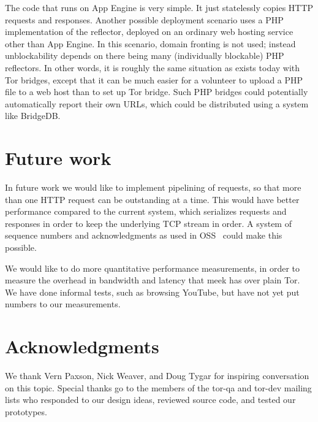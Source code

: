 \documentclass{article}
\begin{document}

The code that runs on App Engine is very simple.
It just statelessly copies HTTP requests and responses.
Another possible deployment scenario uses a PHP implementation of the reflector,
deployed on an ordinary web hosting service other than App Engine.
In this scenario, domain fronting is not used;
instead unblockability depends on there being many (individually blockable) PHP reflectors.
In other words, it is roughly the same situation as exists today with Tor bridges,
except that it can be much easier for a volunteer to upload a PHP file to a web host
than to set up Tor bridge.
Such PHP bridges could potentially automatically report their own URLs,
which could be distributed using a system like BridgeDB.

\section{Future work}

In future work we would like to implement pipelining of requests,
so that more than one HTTP request can be outstanding at a time.
This would have better performance compared to the current system,
which serializes requests and responses in order to keep the
underlying TCP stream in order.
A system of sequence numbers and acknowledgments as used in OSS~\cite{oss}
could make this possible.

We would like to do more quantitative performance measurements,
in order to measure the overhead in bandwidth and latency that meek has over plain Tor.
We have done informal tests, such as browsing YouTube,
but have not yet put numbers to our measurements.


\section{Acknowledgments}

We thank Vern Paxson, Nick Weaver, and Doug Tygar for inspiring conversation on this topic.
Special thanks go to the members of the tor-qa and tor-dev mailing lists
who responded to our design ideas, reviewed source code, and tested our prototypes.



  

\end{document}
